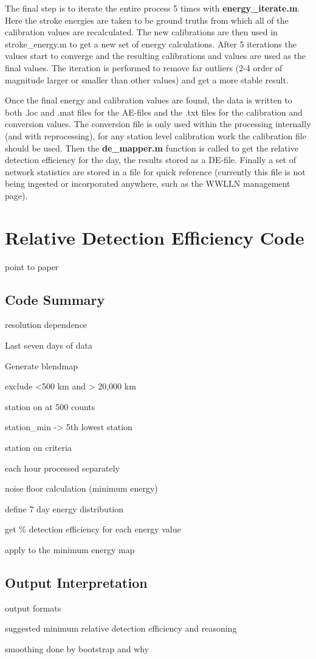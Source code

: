 The final step is to iterate the entire process 5 times with {\bf energy\_iterate.m}.
Here the stroke energies are taken to be ground truths from which all of the calibration values are recalculated.
The new calibrations are then used in stroke\_energy.m to get a new set of energy calculations.
After 5 iterations the values start to converge and the resulting calibrations and values are used as the final values.
The iteration is performed to remove far outliers (2-4 order of magnitude larger or smaller than other values) and get a more stable result.

Once the final energy and calibration values are found, the data is written to both .loc and .mat files for the AE-files and the .txt files for the calibration and conversion values.
The conversion file is only used within the processing internally (and with reprocessing), for any station level calibration work the calibration file should be used.
Then the {\bf de\_mapper.m} function is called to get the relative detection efficiency for the day, the results stored as a DE-file.
Finally a set of network statistics are stored in a file for quick reference (currently this file is not being ingested or incorporated anywhere, such as the WWLLN management page).

\section{Relative Detection Efficiency Code}

point to paper

\subsection{Code Summary}

resolution dependence

Last seven days of data

Generate blendmap

exclude <500 km and > 20,000 km

station on at 500 counts

station_min -> 5th lowest station

station on criteria

each hour processed separately

noise floor calculation (minimum energy)

define 7 day energy distribution

get \% detection efficiency for each energy value

apply to the minimum energy map

\subsection{Output Interpretation}

output formats

suggested minimum relative detection efficiency and reasoning

smoothing done by bootstrap and why
